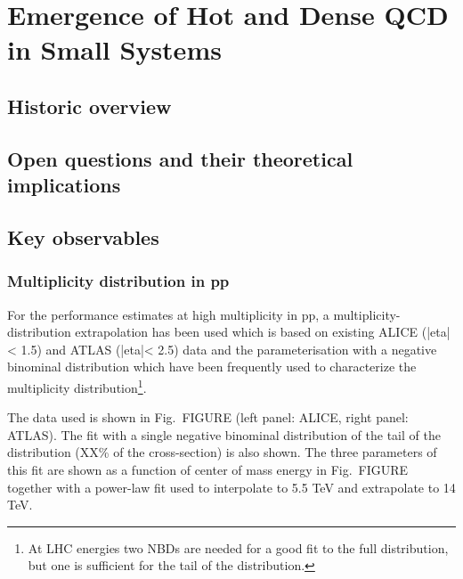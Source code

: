 \documentclass[../report.tex]{subfiles}
\begin{document}
\section{Emergence of Hot and Dense QCD in Small Systems}

\subsection{Historic overview}

\subsection{Open questions and their theoretical implications}


\subsection{Key observables}

\subsubsection{Multiplicity distribution in pp}

For the performance estimates at high multiplicity in pp, a multiplicity-distribution extrapolation has been used which is based on existing ALICE (|eta| < 1.5) and ATLAS (|eta|< 2.5) data and the parameterisation with a negative binominal distribution which have been frequently used to characterize the multiplicity distribution\footnote{At LHC energies two NBDs are needed for a good fit to the full distribution, but one is sufficient for the tail of the distribution.}.

The data used is shown in Fig.~FIGURE (left panel: ALICE, right panel: ATLAS). The fit with a single negative binominal distribution of the tail of the distribution (XX\% of the cross-section) is also shown. The three parameters of this fit are shown as a function of center of mass energy in Fig.~FIGURE together with a power-law fit used to interpolate to 5.5 TeV and extrapolate to 14 TeV.
\end{document}
